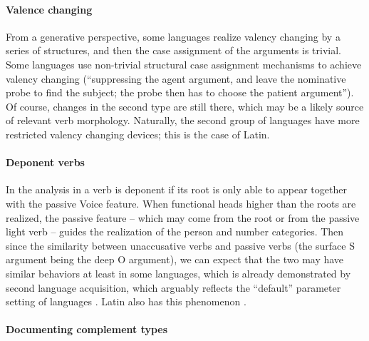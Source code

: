 {\paragraph{Valence changing} From a generative perspective, some languages realize valency changing 
by a series of \vP{} structures, and then the case assignment of the arguments is trivial.
Some languages use non-trivial structural case assignment mechanisms
to achieve valency changing 
(``suppressing the agent argument, 
and leave the nominative probe to find the subject;
the probe then has to choose the patient argument'').
Of course, \vP{} changes in the second type are still there,
which may be a likely source of relevant verb morphology.
Naturally, the second group of languages have more restricted valency changing devices;
this is the case of Latin.

\paragraph{Deponent verbs} 
In the analysis in \citet{embick2000features} 
a verb is deponent if its root is only able to 
appear together with the passive Voice feature. 
When functional heads higher than the roots are realized,
the passive feature -- which may come from the root or from the passive light verb -- 
guides the realization of the person and number categories.
Then since the similarity between unaccusative verbs and passive verbs
(the surface S argument being the deep O argument),
we can expect that
the two may have similar behaviors at least in some languages,
which is already demonstrated by second language acquisition,
which arguably reflects the ``default'' parameter setting of languages \citep{balcom1997happened}.
Latin also has this phenomenon \citep[]{oniga2014latin}.

\paragraph{Documenting complement types}

}
